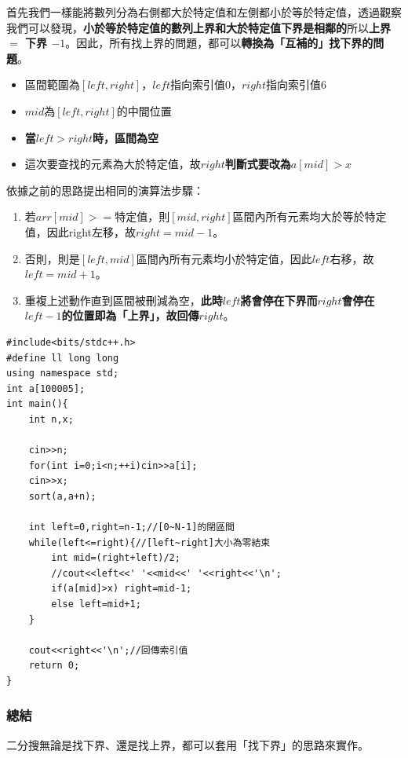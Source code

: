     首先我們一樣能將數列分為右側都大於特定值和左側都小於等於特定值，透過觀察我們可以發現，\textbf{小於等於特定值的數列上界和大於特定值下界是相鄰的}所以\textbf{上界 $=$ 下界 $- 1$}。因此，所有找上界的問題，都可以\textbf{轉換為「互補的」找下界的問題}。

    \begin{itemize}
        \item 區間範圍為$[left,right]$，$left$指向索引值$0$，$right$指向索引值$6$
        \item $mid$為$[left,right]$的中間位置
        \item \textbf{當$left>right$時，區間為空}
        \item 這次要查找的元素為大於特定值，故\textbf{$right$判斷式要改為$a[mid]>x$}
    \end{itemize}

    依據之前的思路提出相同的演算法步驟：
    \begin{enumerate}
        \item 若$arr[mid]>=$特定值，則$[mid,right]$區間內所有元素均大於等於特定值，因此right左移，故\textbf{$right=mid-1$}。
        \item 否則，則是$[left,mid]$區間內所有元素均小於特定值，因此$left$右移，故\textbf{$left=mid+1$}。
        \item 重複上述動作直到區間被刪減為空，\textbf{此時$left$將會停在下界而$right$會停在$left-1$的位置即為「上界」，故回傳$right$}。
    \end{enumerate}

    \begin{lstlisting}
#include<bits/stdc++.h>
#define ll long long
using namespace std;
int a[100005];
int main(){
    int n,x;
    
    cin>>n;
    for(int i=0;i<n;++i)cin>>a[i];
    cin>>x;
    sort(a,a+n);
    
    int left=0,right=n-1;//[0~N-1]的閉區間 
    while(left<=right){//[left~right]大小為零結束 
        int mid=(right+left)/2;
        //cout<<left<<' '<<mid<<' '<<right<<'\n';
        if(a[mid]>x) right=mid-1;
        else left=mid+1;
    }
    
    cout<<right<<'\n';//回傳索引值
    return 0;
} \end{lstlisting}

    \subsubsection{總結}
    二分搜無論是找下界、還是找上界，都可以套用「找下界」的思路來實作。

